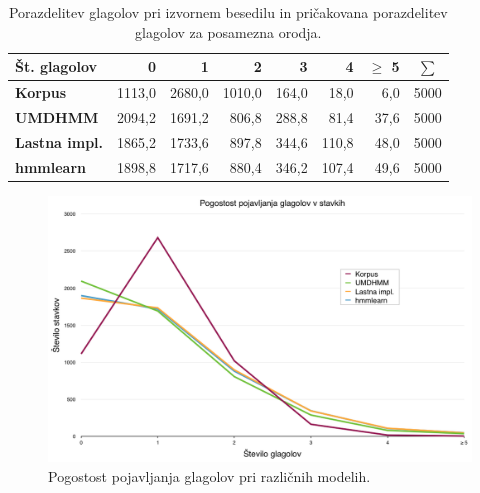 \begin{table}
\centering
\begin{tabular}{l rrrrrr c}
\toprule
{\bf Št. glagolov} & {\bf 0} & {\bf 1} & {\bf 2} & {\bf 3} & {\bf 4} & {\bf $\geq$ 5} & {\bf $\sum$} \\
\midrule
{\bf Korpus}        & 1113,0 & 2680,0 & 1010,0 & 164,0 &  18,0 &  6,0 & 5000 \\
{\bf UMDHMM}        & 2094,2 & 1691,2 &  806,8 & 288,8 &  81,4 & 37,6 & 5000 \\
{\bf Lastna impl.}  & 1865,2 & 1733,6 &  897,8 & 344,6 & 110,8 & 48,0 & 5000 \\
{\bf hmmlearn}      & 1898,8 & 1717,6 &  880,4 & 346,2 & 107,4 & 49,6 & 5000 \\
\bottomrule
\end{tabular}
\caption{Porazdelitev glagolov pri izvornem besedilu in pričakovana
  porazdelitev glagolov za posamezna orodja.}
\label{tab:bench_model_table}
\end{table}

\begin{figure}
\begin{center}
\includegraphics[width=\textwidth]{images/bench_model_comparison.png}
\end{center}
\caption{Pogostost pojavljanja glagolov pri različnih modelih.}
\label{fig:bench_model_comparison}
\end{figure}
